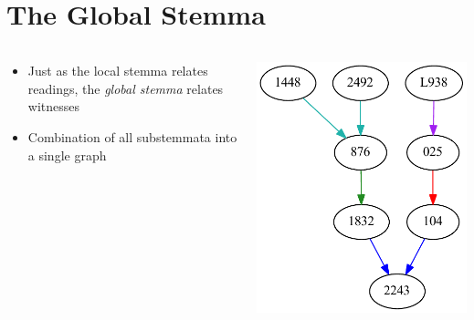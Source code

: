 \documentclass[10pt]{beamer}
\begin{document}
	\section*{The Global Stemma}
	\begin{frame}
		\begin{columns}
			\begin{column}{0.45\textwidth}
				\begin{itemize}
					\item Just as the local stemma relates readings, the \emph{global stemma} relates witnesses
					\item Combination of all substemmata into a single graph
				\end{itemize}
			\end{column}
			\begin{column}{0.45\textwidth}
				\begin{center}
					\includegraphics[width=\textwidth]{../img/partial-global-stemma.pdf}
				\end{center}
			\end{column}
		\end{columns}
	\end{frame}
\end{document}
